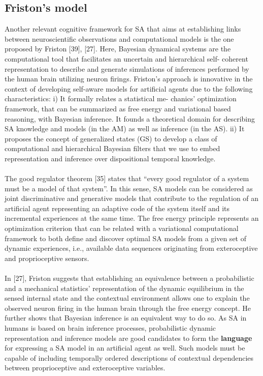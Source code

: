 \documentclass{article}
\begin{document}
		\subsection{Friston’s model}
		Another relevant cognitive framework for SA that aims at
		establishing links between neuroscientific observations and
		computational models is the one proposed by Friston [39],
		[27]. Here, Bayesian dynamical systems are the computational
		tool that facilitates an uncertain and hierarchical self-
		coherent representation to describe and generate simulations
		of inferences performed by the human brain utilizing neuron
		firings. Friston’s approach is innovative in the context of
		developing self-aware models for artificial agents due to the
		following characteristics: i) It formally relates a statistical me-
		chanics’ optimization framework, that can be summarized as
		free energy and variational based reasoning, with Bayesian
		inference. It founds a theoretical domain for describing SA
		knowledge and models (in the AM) as well as inference (in
		the AS). ii) It proposes the concept of generalized states (GS)
		to develop a class of computational and hierarchical Bayesian
		filters that we use to embed representation and inference over
		dispositional temporal knowledge.
		\paragraph{} The good regulator theorem [35] states that “every good
		regulator of a system must be a model of that system”. In this
		sense, SA models can be considered as joint discriminative
		and generative models that contribute to the regulation of an artificial agent representing an adaptive code of the system
		itself and its incremental experiences at the same time. The
		free energy principle represents an optimization criterion that
		can be related with a variational computational framework to
		both define and discover optimal SA models from a given
		set of dynamic experiences, i.e., available data sequences
		originating from exteroceptive and proprioceptive sensors.
		\paragraph{} In [27], Friston suggests that establishing an equivalence
		between a probabilistic and a mechanical statistics’ representation of the dynamic equilibrium in the sensed internal
		state and the contextual environment allows one to explain
		the observed neuron firing in the human brain through the free
		energy concept. He further shows that Bayesian inference is an
		equivalent way to do so. As SA in humans is based on brain
		inference processes, probabilistic dynamic representation and
		inference models are good candidates to form the \textbf{language}
		for expressing a SA model in an artificial agent as well. Such
		models must be capable of including temporally ordered descriptions of contextual dependencies between proprioceptive
		and exteroceptive variables.
\end{document}
